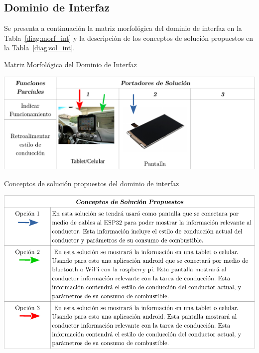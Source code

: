 \subsection{Dominio de Interfaz}
Se presenta a continuación la matriz morfológica del dominio de interfaz en la Tabla~\ref{diag:morf_int} y la descripción de los conceptos de solución propuestos en la Tabla~\ref{diag:sol_int}.
\begin{table}[htbp!]
  \caption{Matriz Morfológica del Dominio de Interfaz}
  \label{diag:morf_int}
  \centering
  \includegraphics[width=0.9\linewidth]{morf_int.pdf}
\end{table}

\begin{table}[htbp!]
  \caption{Conceptos de solución propuestos del dominio de interfaz}
  \label{diag:sol_int}
  \includegraphics[width=\linewidth]{sol_int.pdf}
\end{table}

